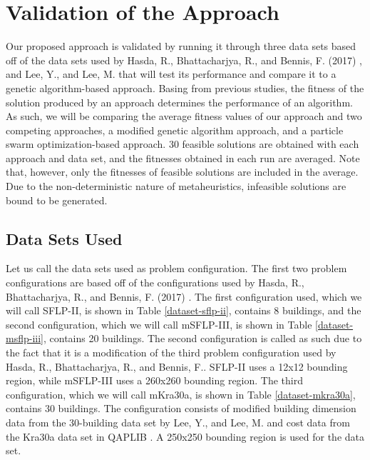 \chapter{Validation of the Approach}
Our proposed approach is validated by running it through three data sets based off of the data sets used by Hasda, R., Bhattacharjya, R., and Bennis, F. (2017) \cite{Hasda2017}, and Lee, Y., and Lee, M. \cite{Lee2002} that will test its performance and compare it to a genetic algorithm-based approach. Basing from previous studies, the fitness of the solution produced by an approach determines the performance of an algorithm. As such, we will be comparing the average fitness values of our approach and two competing approaches, a modified genetic algorithm approach, and a particle swarm optimization-based approach. 30 feasible solutions are obtained with each approach and data set, and the fitnesses obtained in each run are averaged. Note that, however, only the fitnesses of feasible solutions are included in the average. Due to the non-deterministic nature of metaheuristics, infeasible solutions are bound to be generated.

\section{Data Sets Used}
Let us call the data sets used as problem configuration. The first two problem configurations are based off of the configurations used by Hasda, R., Bhattacharjya, R., and Bennis, F. (2017) \cite{Hasda2017}. The first configuration used, which we will call SFLP-II, is shown in Table \ref{dataset-sflp-ii}, contains 8 buildings, and the second configuration, which we will call mSFLP-III, is shown in Table \ref{dataset-msflp-iii}, contains 20 buildings. The second configuration is called as such due to the fact that it is a modification of the third problem configuration used by Hasda, R., Bhattacharjya, R., and Bennis, F.. SFLP-II uses a 12x12 bounding region, while mSFLP-III uses a 260x260 bounding region. The third configuration, which we will call mKra30a, is shown in Table \ref{dataset-mkra30a}, contains 30 buildings. The configuration consists of modified building dimension data from the 30-building data set by Lee, Y., and Lee, M. \cite{Lee2002} and cost data from the Kra30a data set in QAPLIB \cite{QAPLib}. A 250x250 bounding region is used for the data set.

